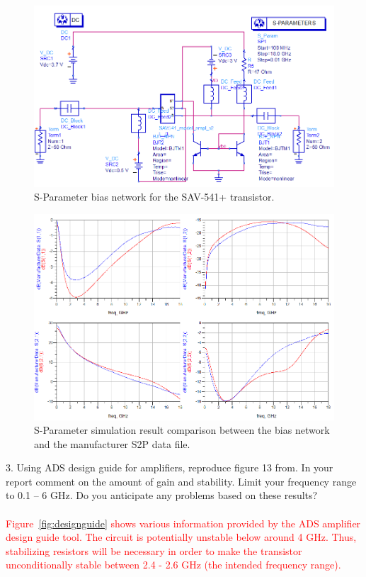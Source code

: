 \documentclass[conference]{IEEEtran}
\begin{document}
\begin{figure}[!h]
\centering
\includegraphics[scale=0.35]{pics/sparametercomparison-circuit-untuned.png}
\caption{S-Parameter bias network for the SAV-541+ transistor.}
\label{fig:sparamcircuit}
\end{figure}
\begin{figure}[!h]
\centering
\includegraphics[scale=0.35]{pics/sparametercomparison-untuned.png}
\caption{S-Parameter simulation result comparison between the bias network and the manufacturer S2P data file.}
\label{fig:sparamresult}
\end{figure}
3. Using ADS design guide for amplifiers, reproduce figure 13 from\cite{payne}. In your report comment on the amount of gain and stability. Limit your frequency range to 0.1 – 6 GHz. Do you anticipate any problems based on these results?\\\\
\textcolor{red}{Figure~\ref{fig:designguide} shows various information provided by the ADS amplifier design guide tool.  The circuit is potentially unstable below around 4 GHz.  Thus, stabilizing resistors will be necessary in order to make the transistor unconditionally stable between 2.4 - 2.6 GHz (the intended frequency range).}
\end{document}
